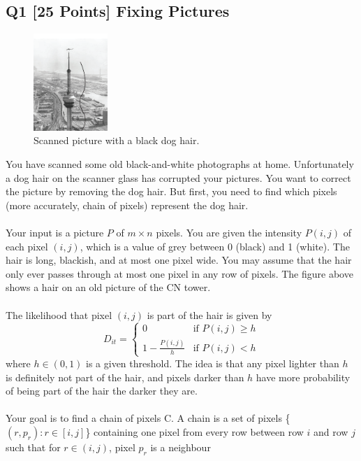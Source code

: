 \documentclass[10pt]{article}
\begin{document}
\subsection*{Q1 [25 Points] Fixing Pictures}
\begin{figure}[h]
    \centering
    \includegraphics[width=0.25\textwidth]{A2_1.png}
    \caption{Scanned picture with a black dog hair.}
\end{figure}
You have scanned some old black-and-white photographs at home. Unfortunately a dog hair on the scanner glass has corrupted your pictures. You want to correct the picture by removing the dog hair. But first, you need to find which pixels (more accurately, chain of pixels) represent the dog hair.\\
\\
Your input is a picture $P$ of $m × n$ pixels. You are given the intensity $P(i, j)$ of each pixel $(i, j)$, which is a value of grey between 0 (black) and 1 (white). The hair is long, blackish, and at most one pixel wide. You may assume that the hair only ever passes through at most one pixel in any row of pixels. The figure above shows a hair on an old picture of the CN tower.\\
\\
The likelihood that pixel $(i, j)$ is part of the hair is given by\\
\begin{equation*}
  D_{it} =
    \begin{cases}
      0 & \text{if $P(i, j) \geq h$}\\
      1 - \frac{P(i, j)}{h} & \text{if $P(i, j) < h$}
    \end{cases}       
\end{equation*}
where $h \in (0, 1)$ is a given threshold. The idea is that any pixel lighter than $h$ is definitely not part of the hair, and pixels darker than $h$ have more probability of being part of the hair the darker they are.\\
\\
Your goal is to find a chain of pixels C. A chain is a set of pixels \{$(r, p_r) : r \in [i, j]$\} containing one pixel from every row between row $i$ and row $j$ such that for $r \in (i, j)$, pixel $p_r$ is a neighbour
\end{document}
